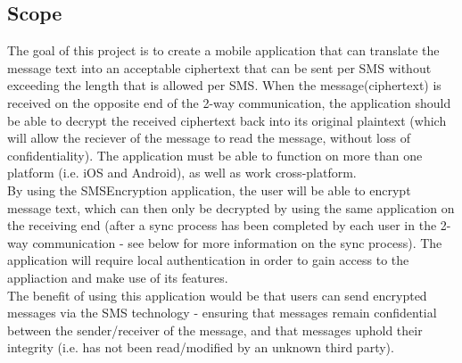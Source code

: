 \subsection{Scope}
The goal of this project is to create a mobile application that can translate the message text into an acceptable ciphertext that can be sent per SMS without exceeding the length that is allowed per SMS. When the message(ciphertext) is received on the opposite end of the 2-way communication, the application should be able to decrypt the received ciphertext back into its original plaintext (which will allow the reciever of the message to read the message, without loss of confidentiality). The application must be able to function on more than one platform (i.e. iOS and Android), as well as work cross-platform.
\vspace{10pt}\\
By using the SMSEncryption application, the user will be able to encrypt message text, which can then only be decrypted by using the same application on the receiving end (after a sync process has been completed by each user in the 2-way communication - see below for more information on the sync process). The application will require local authentication in order to gain access to the appliaction and make use of its features.
\vspace{10pt}\\
The benefit of using this application would be that users can send encrypted messages via the SMS technology - ensuring that messages remain confidential between the sender/receiver of the message, and that messages uphold their integrity (i.e. has not been read/modified by an unknown third party).

